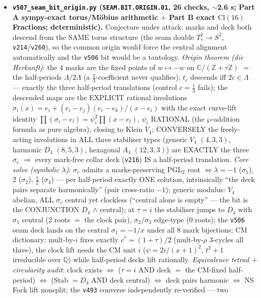 \begin{itemize}[leftmargin=1.5em]
\item \textbf{\texttt{v507\_seam\_bit\_origin.py} (\texttt{SEAM.BIT.ORIGIN.01}, 26 checks, $\sim$2.6 s;
Part A sympy-exact torus/M\"obius arithmetic $+$ Part B exact $\mathrm{Cl}(16)$ Fractions;
deterministic).} Conjecture under attack: marks and deck both descend from the SAME torus structure
(the seam double $T^2_\tau\to S^2$, \texttt{v214}/\texttt{v260}), so the common origin would force
the central alignment automatically and the \texttt{v506} bit would be a tautology.
\emph{Origin theorem (die Herkunft)}: the $4$ marks are the fixed points of $w\mapsto-w$ on
$\mathbb C/(\mathbb Z{+}\tau\mathbb Z)$ $=$ the half-periods $\Lambda/2\Lambda$ (a
$\tfrac13$-coefficient never qualifies); $t_c$ descends iff $2c\in\Lambda$ --- exactly the three
half-period translations (control $c=\tfrac13$ fails); the descended maps are the EXPLICIT rational
involutions $\sigma_i(x)=e_i+(e_i{-}e_j)(e_i{-}e_k)/(x{-}e_i)$ with the exact curve-lift identity
$\prod(\sigma_i{-}e_l)=\psi_i^2\prod(x{-}e_l)$, $\psi_i$ RATIONAL (the $\wp$-addition formula as
pure algebra), closing to Klein $V_4$; CONVERSELY the freely-acting involutions in ALL three
stabiliser types (generic $V_4$ $(4,3,3)$, harmonic $D_4$ $(8,5,3)$, hexagonal $A_4$ $(12,3,3)$)
are EXACTLY the three $\sigma_c$ $\Rightarrow$ every mark-free collar deck (\texttt{v216}) IS a
half-period translation. \emph{Core solve (symbolic $\lambda$)}: $\sigma_c$ admits a
marks-preserving $\mathrm{PGL}_2$ root $\iff\lambda=-1$ ($\sigma_1$), $2$ ($\sigma_2$), $\tfrac12$
($\sigma_3$) --- per half-period exactly ONE solution, intrinsically ``the deck pairs separate
harmonically'' (pair cross-ratio $-1$); generic modulus: $V_4$ abelian, ALL $\sigma_c$ central yet
clockless (``central alone is empty'' --- the bit is the CONJUNCTION $D_4$ $\wedge$ central); at
$\tau=i$ the stabiliser jumps to $D_4$ with $\sigma_1$ central ($2$ roots $=$ the clock pair),
$\sigma_2/\sigma_3$ edge-type ($0$ roots); the \texttt{v506} seam deck lands on the central
$\sigma_1=-1/x$ under all $8$ mark bijections; CM dictionary: mult-by-$i$ fixes exactly
$c^*=(1{+}\tau)/2$ (mult-by-$\rho$ $3$-cycles all three), the clock lift needs the CM unit $i$
($\psi=2i/(x{+}1)^2$, $t^2{+}1$ irreducible over $\mathbb Q$) while half-period decks lift
rationally. \emph{Equivalence tetrad $+$ circularity audit}: clock exists $\iff$ ($\tau{=}i$ AND
deck $=$ the CM-fixed half-period) $\iff$ (Stab $=D_4$ AND deck central) $\iff$ deck pairs harmonic
$\iff$ NS Fock lift nonsplit; the \texttt{v493} converse independently re-verified --- two

\end{itemize}
